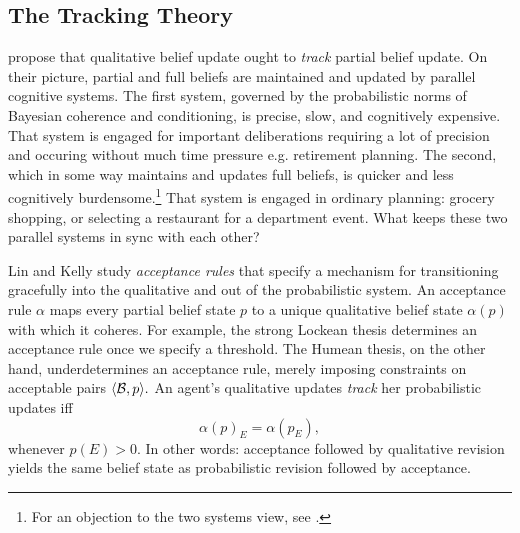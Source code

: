 \subsection{The Tracking Theory}

\citet{lin2012propositional} propose that qualitative belief update ought to
{\em track} partial belief update. On their picture, partial and full beliefs
are maintained and updated by parallel cognitive systems. The first system,
governed by the probabilistic norms of Bayesian coherence and conditioning, is
precise, slow, and cognitively expensive. That system is engaged for important
deliberations requiring a lot of precision and occuring without much time
pressure e.g. retirement planning. The second, which in some way maintains and
updates full beliefs, is quicker and less cognitively burdensome.\footnote{For
an objection to the two systems view, see \citet{staffel2018beliefs}. } That
system is engaged in ordinary planning: grocery shopping, or selecting a
restaurant for a department event. What keeps these two parallel systems in sync
with each other?

Lin and Kelly study {\em acceptance rules} that specify a mechanism for
transitioning gracefully into the qualitative and out of the probabilistic
system. An acceptance rule $\alpha$ maps every partial belief state $p$ to a
unique qualitative belief state $\alpha(p)$ with which it coheres. For example,
the strong Lockean thesis determines an acceptance rule once we specify a
threshold. The Humean thesis, on the other hand, underdetermines an acceptance
rule, merely imposing constraints on acceptable pairs $\langle \mathcal{B}, p \rangle.$
An agent's qualitative updates {\em track} her probabilistic updates iff
$$\alpha(p)_E=\alpha(p_E),$$ whenever $p(E)>0$. In other words: acceptance
followed by qualitative revision yields the same belief state as probabilistic
revision followed by acceptance.

